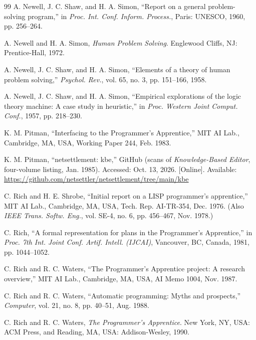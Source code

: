 \documentclass[11pt]{article}
\begin{document}
\begin{thebibliography}{99}
 A. Newell, J. C. Shaw, and H. A. Simon,
  ``Report on a general problem-solving program,'' in
  \textit{Proc. Int. Conf. Inform. Process.}, Paris: UNESCO, 1960,
  pp. 256--264.

 A. Newell and H. A. Simon, \textit{Human
  Problem Solving}. Englewood Cliffs, NJ: Prentice-Hall, 1972.

 A. Newell, J. C. Shaw, and H. A. Simon,
  ``Elements of a theory of human problem solving,''
  \textit{Psychol. Rev.}, vol. 65, no. 3, pp. 151--166, 1958.

 A. Newell, J. C. Shaw, and H. A. Simon, ``Empirical
  explorations of the logic theory machine: A case study in
  heuristic,'' in \textit{Proc. Western Joint Comput. Conf.}, 1957,
  pp. 218--230.

 K. M. Pitman, ``Interfacing to the
  Programmer's Apprentice,'' MIT AI Lab., Cambridge, MA, USA, Working
  Paper 244, Feb. 1983.

 K. M. Pitman, ``netsettlement: kbe,'' GitHub
  (scans of \textit{Knowledge-Based Editor}, four-volume listing,
  Jan. 1985). Accessed: Oct. 13, 2026. [Online]. Available:
  \url{https://github.com/netsettler/netsettlement/tree/main/kbe}

 C. Rich and H. E. Shrobe, ``Initial report on
  a LISP programmer's apprentice,'' MIT AI Lab., Cambridge, MA, USA,
  Tech. Rep. AI-TR-354, Dec. 1976. (Also \textit{IEEE Trans. Softw.
  Eng.}, vol. SE-4, no. 6, pp. 456--467, Nov. 1978.)

 C. Rich, ``A formal representation for plans in the
  Programmer's Apprentice,'' in \textit{Proc. 7th Int. Joint Conf.
  Artif. Intell. (IJCAI)}, Vancouver, BC, Canada, 1981, pp. 1044--1052.

 C. Rich and R. C. Waters, ``The
  Programmer's Apprentice project: A research overview,'' MIT AI Lab.,
  Cambridge, MA, USA, AI Memo 1004, Nov. 1987.

 C. Rich and R. C. Waters, ``Automatic
  programming: Myths and prospects,'' \textit{Computer}, vol. 21, no. 8,
  pp. 40--51, Aug. 1988.

 C. Rich and R. C. Waters, \textit{The
  Programmer's Apprentice}. New York, NY, USA: ACM Press, and Reading,
  MA, USA: Addison-Wesley, 1990.


\end{thebibliography}
\end{document}
